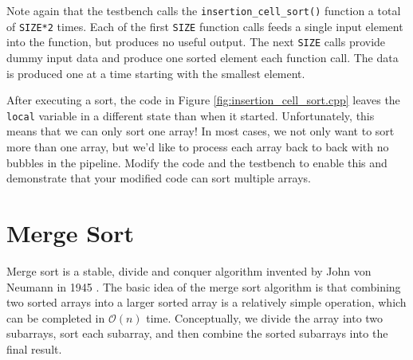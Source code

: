 Note again that the testbench calls the \lstinline{insertion_cell_sort()} function a total of \lstinline{SIZE*2} times. Each of the first \lstinline{SIZE} function calls feeds a single input element into the function, but produces no useful output. The next \lstinline{SIZE} calls provide dummy input data and produce one sorted element each function call.  The data is produced one at a time starting with the smallest element.

\begin{exercise}
After executing a sort, the code in Figure \ref{fig:insertion_cell_sort.cpp} leaves the \lstinline{local} variable in a different state than when it started.  Unfortunately, this means that we can only sort one array! In most cases, we not only want to sort more than one array, but we'd like to process each array back to back with no bubbles in the pipeline.   Modify the code and the testbench to enable this and demonstrate that your modified code can sort multiple arrays.
\end{exercise}

\section{Merge Sort}
\label{sec:sort:merge}
Merge sort is a stable, divide and conquer algorithm invented by John von Neumann in 1945 \cite{knuth1998art}. The basic idea of the merge sort algorithm is that combining two sorted arrays into a larger sorted array is a relatively simple operation, which can be completed in $\mathcal{O}(n)$ time.    Conceptually, we divide the array into two subarrays, sort each subarray, and then combine the sorted subarrays into the final result. 

